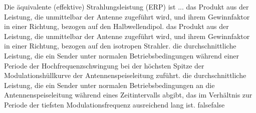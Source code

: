     {Die äquivalente (effektive) Strahlungsleistung (ERP) ist ...}
    {das Produkt aus der Leistung, die unmittelbar der Antenne zugeführt wird, und ihrem Gewinnfaktor in einer Richtung, bezogen auf den Halbwellendipol.}
    {das Produkt aus der Leistung, die unmittelbar der Antenne zugeführt wird, und ihrem Gewinnfaktor in einer Richtung, bezogen auf den isotropen Strahler.}
    {die durchschnittliche Leistung, die ein Sender unter normalen Betriebsbedingungen während einer Periode der Hochfrequenzschwingung bei der höchsten Spitze der Modulationshüllkurve der Antennenspeiseleitung zuführt.}
    {die durchschnittliche Leistung, die ein Sender unter normalen Betriebsbedingungen an die Antennenspeiseleitung während eines Zeitintervalls abgibt, das im Verhältnis zur Periode der tiefsten Modulationsfrequenz ausreichend lang ist.}
    {false}{false}